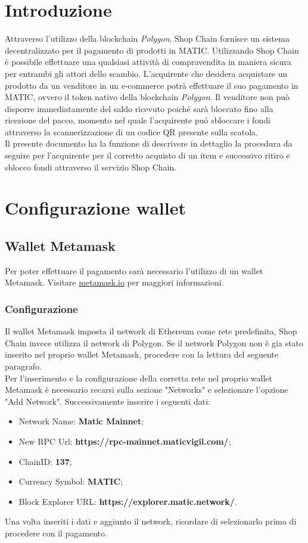 \documentclass[a4paper, 12pt]{article}
\begin{document}
\makefrontpage
\makeversioni
\tableofcontents
\newpage

\section{Introduzione}
Attraverso l'utilizzo della blockchain \textit{Polygon}, Shop Chain fornisce un sistema decentralizzato per il pagamento di prodotti in MATIC. Utilizzando Shop Chain è possibile effettuare una qualsiasi attività di compravendita in maniera sicura per entrambi gli attori dello scambio. L'acquirente che desidera acquistare un prodotto da un venditore in un e-commerce potrà effettuare il suo pagamento in MATIC, ovvero il token nativo della blockchain \textit{Polygon}. Il venditore non può disporre immediatamente del saldo ricevuto poiché sarà bloccato fino alla ricezione del pacco, momento nel quale l'acquirente può sbloccare i fondi attraverso la scannerizzazione di un codice QR presente sulla scatola.\\
Il presente documento ha la funzione di descrivere in dettaglio la procedura da seguire per l'acquirente per il corretto acquisto di un item e successivo ritiro e sblocco fondi attraverso il servizio Shop Chain.

\newpage
\section{Configurazione wallet}
\subsection{Wallet Metamask}
Per poter effettuare il pagamento sarà necessario l'utilizzo di un wallet Metamask. Visitare \href{https://www.metamask.io}{metamask.io} per maggiori informazioni.
\subsubsection{Configurazione}
\label{sec:network}
Il wallet Metamask imposta il network di Ethereum come rete predefinita, Shop Chain invece utilizza il network di Polygon. Se il network Polygon non è gia stato inserito nel proprio wallet Metamask, procedere con la lettura del seguente paragrafo.
\\Per l'inserimento e la configurazione della corretta rete nel proprio wallet Metamask è necessario recarsi sulla sezione "Networks" e selezionare l'opzione "Add Network". Successivamente inserire i seguenti dati:
\begin{itemize}
\item Network Name: \textbf{Matic Mainnet};
\item New RPC Url: \textbf{https://rpc-mainnet.maticvigil.com/};
\item ChainID: \textbf{137};
\item Currency Symbol: \textbf{MATIC};
\item Block Explorer URL: \textbf{https://explorer.matic.network/}.
\end{itemize}
Una volta inseriti i dati e aggiunto il network, ricordare di selezionarlo prima di procedere con il pagamento.
\end{document}
